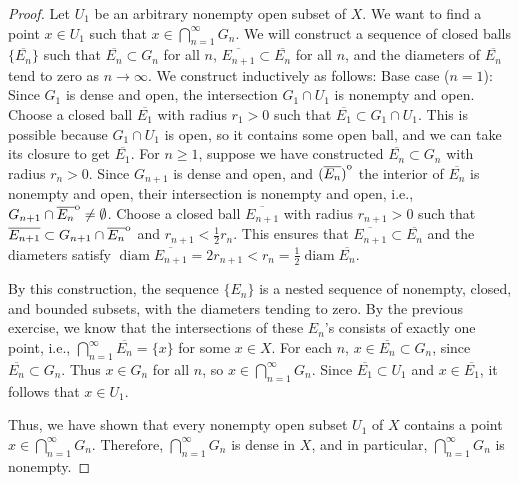 \documentclass[11pt]{article}
\DeclareMathOperator{\diam}{diam}
\newcommand{\interior}[1]{%
  {\kern0pt#1}^{\mathrm{o}}%
}
\begin{document}
\begin{exercise}{22}
    \begin{proof}
        Let $U_1$ be an arbitrary nonempty open subset of $X$. We want to find a point $x \in U_1$ such that $x \in \bigcap_{n=1}^\infty G_n$. We will construct a sequence of closed balls $\{ \overline{E_n} \}$ such that $\overline{E_n} \subset G_n$ for all $n$, $\overline{E_{n+1}} \subset \overline{E_n}$ for all $n$, and the diameters of $\overline{E_n}$ tend to zero as $n \to \infty$. We construct inductively as follows: Base case ($n=1$): Since $G_1$ is dense and open, the intersection $G_1 \cap U_1$ is nonempty and open. Choose a closed ball $\overline{E_1}$ with radius $r_1 > 0$ such that $\overline{E_1} \subset G_1 \cap U_1$. This is possible because $G_1 \cap U_1$ is open, so it contains some open ball, and we can take its closure to get $\overline{E_1}$. For $n \ge 1$, suppose we have constructed $\overline{E_n} \subset G_n$ with radius $r_n > 0$. Since $G_{n+1}$ is dense and open, and $\interior{(\overline{E_n})}$ the interior of $\overline{E_n}$ is nonempty and open, their intersection is nonempty and open, i.e., $G_{n+1} \cap \interior{\overline{E_n}} \neq \emptyset$. Choose a closed ball $\overline{E_{n+1}}$ with radius $r_{n+1} > 0$ such that $\overline{E_{n+1}} \subset G_{n+1} \cap \interior{\overline{E_n}}$ and $r_{n+1} < \frac{1}{2} r_n$. This ensures that $\overline{E_{n+1}} \subset \overline{E_n}$ and the diameters satisfy $\diam \overline{E_{n+1}} = 2r_{n+1} < r_n = \frac{1}{2} \diam \overline{E_n}$. 

        By this construction, the sequence $\{ E_n \}$ is a nested sequence of nonempty, closed, and bounded subsets, with the diameters tending to zero. By the previous exercise, we know that the intersections of these $E_n$'s consists of exactly one point, i.e., $\bigcap_{n=1}^\infty \overline{E_n} = \{ x \}$ for some $x \in X$. For each $n$, $x \in \overline{E_n} \subset G_n$, since $\overline{E_n} \subset G_n$. Thus $x \in G_n$ for all $n$, so $x \in \bigcap_{n=1}^\infty G_n$. Since $\overline{E_1} \subset U_1$ and $x \in \overline{E_1}$, it follows that $x \in U_1$. 

        Thus, we have shown that every nonempty open subset $U_1$ of $X$ contains a point $x \in \bigcap_{n=1}^\infty G_n$. Therefore, $\bigcap_{n=1}^\infty G_n$ is dense in $X$, and in particular, $\bigcap_{n=1}^\infty G_n$ is nonempty. 
    \end{proof}
\end{exercise}
\end{document}
